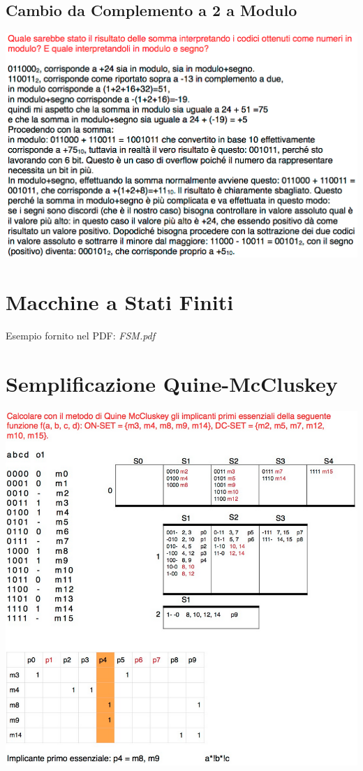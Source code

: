 \documentclass[a4paper, 10pt]{article}
\begin{document}
		\subsection{Cambio da Complemento a 2 a Modulo}
			\includegraphics[width=\textwidth]{Cambio_in_modulo.png}
			
	\section{Macchine a Stati Finiti}
		Esempio fornito nel PDF: \textit{FSM.pdf}
		
	\section{Semplificazione Quine-McCluskey}
		\includegraphics[width=\textwidth]{Semplificazione_QM.png} 
	
		
\end{document}
